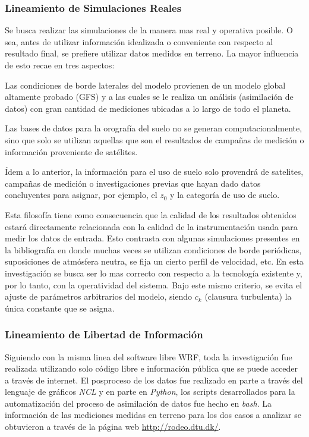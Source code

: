 \subsubsection{Lineamiento de Simulaciones Reales}
Se busca realizar las simulaciones de la manera mas real y operativa posible. O sea, antes de utilizar información idealizada o conveniente con respecto al resultado final, se prefiere utilizar datos medidos en terreno. La mayor influencia de esto recae en tres aspectos:
\begin{enumerate*}
	\item Las condiciones de borde laterales del modelo provienen de un modelo global altamente probado (GFS) y a las cuales se le realiza un análisis (asimilación de datos) con  gran cantidad de mediciones ubicadas a lo largo de todo el planeta.
	\item Las bases de datos para la orografía del suelo no se generan computacionalmente, sino que solo se utilizan aquellas que son el resultados de campañas de medición o información proveniente de satélites.
	\item Ídem a lo anterior, la información para el uso de suelo solo provendrá de satelites, campañas de medición o investigaciones previas que hayan dado datos concluyentes para asignar, por ejemplo, el $z_0$ y la categoría de uso de suelo.
\end{enumerate*}
Esta filosofía tiene como consecuencia que la calidad de los resultados obtenidos estará directamente relacionada con la calidad de la instrumentación usada para medir los datos de entrada. Esto contrasta con algunas simulaciones presentes en la bibliografía en donde muchas veces se utilizan condiciones de borde periódicas, suposiciones de atmósfera neutra, se fija un cierto perfil de velocidad, etc. En esta investigación se busca ser lo mas correcto con respecto a la tecnología existente y, por lo tanto, con la operatividad del sistema. Bajo este mismo criterio, se evita el ajuste de parámetros arbitrarios del modelo, siendo $c_k$ (clausura turbulenta) la única constante que se asigna.
\subsubsection{Lineamiento de Libertad de Información}
Siguiendo con la misma linea del software libre WRF, toda la investigación fue realizada utilizando solo código libre e información pública que se puede acceder a través de internet. El posproceso de los datos fue realizado en parte a través del lenguaje de gráficos \emph{NCL} y en parte en \emph{Python}, los scripts desarrollados para la automatización del proceso de asimilación de datos fue hecho en \emph{bash}. La información de las mediciones medidas en terreno para los dos casos a analizar se obtuvieron a través de la página web \url{http://rodeo.dtu.dk/}.
